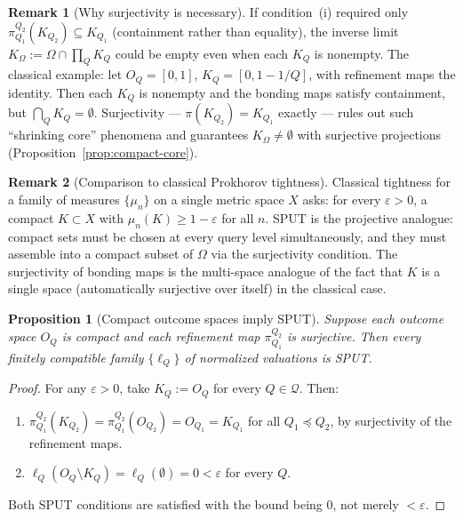 \documentclass[11pt]{article}
\newtheorem{proposition}{Proposition}
\theoremstyle{definition}
\newtheorem{remark}{Remark}
\newcommand{\Qcal}{\mathcal{Q}}
\begin{document}
\begin{remark}[Why surjectivity is necessary]
If condition~(i) required only $\pi^{Q_2}_{Q_1}(K_{Q_2}) \subseteq
K_{Q_1}$ (containment rather than equality), the inverse limit
$K_\Omega := \Omega \cap \prod_Q K_Q$ could be empty even when each
$K_Q$ is nonempty.  The classical example: let $O_Q = [0,1]$,
$K_Q = [0, 1-1/Q]$, with refinement maps the identity.  Then each
$K_Q$ is nonempty and the bonding maps satisfy containment, but
$\bigcap_Q K_Q = \emptyset$.  Surjectivity --- $\pi(K_{Q_2})
= K_{Q_1}$ exactly --- rules out such ``shrinking core'' phenomena and
guarantees $K_\Omega \neq \emptyset$ with surjective projections
(Proposition~\ref{prop:compact-core}).
\end{remark}

\begin{remark}[Comparison to classical Prokhorov tightness]
Classical tightness for a family of measures $\{\mu_n\}$ on a single
metric space $X$ asks: for every $\varepsilon > 0$, a compact
$K \subset X$ with $\mu_n(K) \geq 1-\varepsilon$ for all $n$.  SPUT
is the projective analogue: compact sets must be chosen at every
query level simultaneously, and they must assemble into a compact
subset of $\Omega$ via the surjectivity condition.  The surjectivity
of bonding maps is the multi-space analogue of the fact that $K$ is
a single space (automatically surjective over itself) in the
classical case.
\end{remark}

\begin{proposition}[Compact outcome spaces imply SPUT]
\label{prop:compact-implies-sput}
Suppose each outcome space $O_Q$ is compact and each refinement map
$\pi^{Q_2}_{Q_1}$ is surjective.  Then every finitely compatible
family $\{\ell_Q\}$ of normalized valuations is SPUT.
\end{proposition}

\begin{proof}
For any $\varepsilon > 0$, take $K_Q := O_Q$ for every $Q \in \Qcal$.
Then:
\begin{enumerate}[label=(\roman*)]
\item $\pi^{Q_2}_{Q_1}(K_{Q_2}) = \pi^{Q_2}_{Q_1}(O_{Q_2}) = O_{Q_1}
  = K_{Q_1}$ for all $Q_1 \preceq Q_2$, by surjectivity of the
  refinement maps.
\item $\ell_Q(O_Q \setminus K_Q) = \ell_Q(\emptyset) = 0 < \varepsilon$
  for every $Q$.
\end{enumerate}
Both SPUT conditions are satisfied with the bound being $0$, not
merely $< \varepsilon$.
\end{proof}
\end{document}
